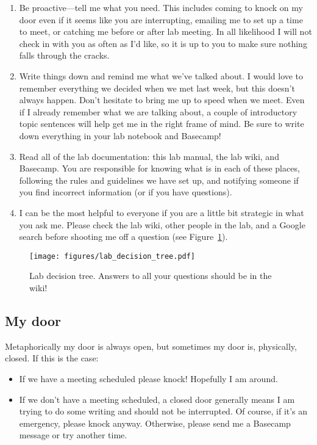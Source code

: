 \documentclass[letterpaper,12pt,oneside]{memoir}
\begin{document}
\begin{enumerate}
\item Be proactive---tell me what you need. This includes coming to knock on my door even if it seems like you are interrupting, emailing me to set up a time to meet, or catching me before or after lab meeting. In all likelihood I will not check in with you as often as I'd like, so it is up to you to make sure nothing falls through the cracks.

\item Write things down and remind me what we've talked about. I would love to remember everything we decided when we met last week, but this doesn't always happen. Don't hesitate to bring me up to speed when we meet. Even if I already remember what we are talking about, a couple of introductory topic sentences will help get me in the right frame of mind. Be sure to write down everything in your lab notebook and Basecamp!

\item Read all of the lab documentation: this lab manual, the lab wiki, and Basecamp. You are responsible for knowing what is in each of these places, following the rules and guidelines we have set up, and notifying someone if you find incorrect information (or if you have questions).

\item I can be the most helpful to everyone if you are a little bit strategic in what you ask me. Please check the lab wiki, other people in the lab, and a Google search before shooting me off a question (see Figure~\ref{fig:decisiontree}).

\end{enumerate}


\begin{figure}
\label{fig:decisiontree}
\texttt{[image: figures/lab\_decision\_tree.pdf]}
\caption{Lab decision tree. Answers to all your questions should be in the wiki!}
\end{figure}

\subsection{My door}
Metaphorically my door is always open, but sometimes my door is, physically, closed. If this is the case:

\begin{itemize}
\item If we have a meeting scheduled please knock! Hopefully I am around.

\item If we don't have a meeting scheduled, a closed door generally means I am trying to do some writing and should not be interrupted. Of course, if it's an emergency, please knock anyway. Otherwise, please send me a Basecamp message or try another time.
\end{itemize}
\end{document}
